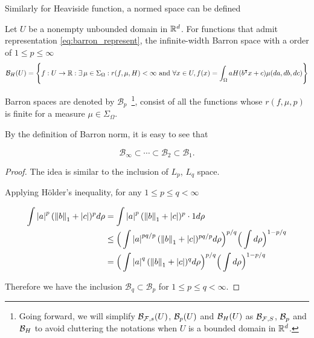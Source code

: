 Similarly for Heaviside function, a normed space can be defined

\begin{definition}
    \label{def:heaviside_space}
    Let $U$ be a nonempty unbounded domain in $\mathbb{R}^d$. For functions that admit
    representation \eqref{eq:barron_represent}, the infinite-width Barron space
    with a order of $1 \leq p \leq \infty$
    \begin{equation}
        \label{def:heaviside_space}
        \mathcal{B}_H(U) = \Bigg\{
            f: U \to \mathbb{R} : \exists\, \mu \in \Sigma_{\Omega}:
            r(f, \mu, H) < \infty \textnormal{ and }
            \forall x \in U, f(x) = \int_{\Omega} a H(b{}^{\intercal} x + c) \mu(da, db, dc)
        \Bigg\}
    \end{equation}
\end{definition}

Barron spaces are denoted by $\mathcal{B}_p$~\footnote{
    Going forward, we will simplify $\mathcal{B}_{\mathcal{F}, s}(U)$, $\mathcal{B}_p(U)$ 
    and $\mathcal{B}_H(U)$ as $\mathcal{B}_{\mathcal{F}, S}$, $\mathcal{B}_p$ and 
    $\mathcal{B}_H$ to avoid cluttering the notations when $U$ is a bounded domain
    in $\mathbb{R}^d$.
}, consist of all the functions whose $r(f, \mu, p)$ is finite for a measure 
$\mu \in \Sigma_{\Omega}$.

\begin{proposition}
    By the definition of Barron norm, it is easy to see that

    \begin{equation}
        \mathcal{B}_{\infty} \subset \cdots \subset \mathcal{B}_{2} 
        \subset \mathcal{B}_1.
    \end{equation}
\end{proposition}



\begin{proof}

The idea is similar to the inclusion of $L_p$, $L_q$ space.

Applying Hölder's inequality, for any $1 \leq p \leq q < \infty$

\begin{align*}
    \int \left| a \right|^p (\left\| b \right\|_1 + \left| c \right|)^p d\rho
     & = \int \left| a \right|^p (\left\| b \right\|_1 + \left| c \right|)^p \cdot 1 d\rho                                                    \\
     & \leq \Big(\int \left| a \right|^{pq/p} (\left\| b \right\|_1 + \left| c \right|)^{pq/p} d\rho \Big)^{p/q} \Big(\int d\rho\Big)^{1-p/q} \\
     & = \Big(\int \left| a \right|^q (\left\| b \right\|_1 + \left| c \right|)^q d\rho \Big)^{p/q} \Big(\int d\rho\Big)^{1-p/q}
\end{align*}

Therefore we have the inclusion $\mathcal{B}_{q} \subset \mathcal{B}_p$ for $1
    \leq p \leq q < \infty$. 
\end{proof}


